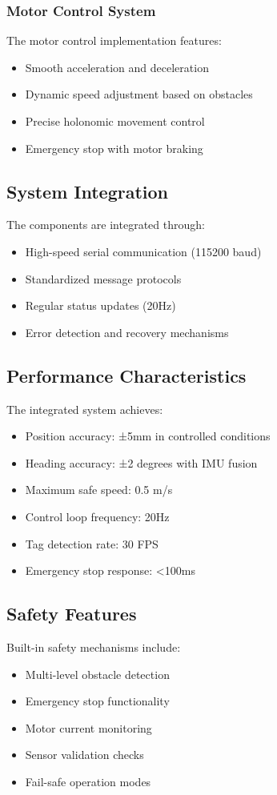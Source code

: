 \documentclass{article}
\begin{document}
\subsubsection{Motor Control System}
The motor control implementation features:
\begin{itemize}
    \item Smooth acceleration and deceleration
    \item Dynamic speed adjustment based on obstacles
    \item Precise holonomic movement control
    \item Emergency stop with motor braking
\end{itemize}

\subsection{System Integration}
The components are integrated through:
\begin{itemize}
    \item High-speed serial communication (115200 baud)
    \item Standardized message protocols
    \item Regular status updates (20Hz)
    \item Error detection and recovery mechanisms
\end{itemize}

\subsection{Performance Characteristics}
The integrated system achieves:
\begin{itemize}
    \item Position accuracy: ±5mm in controlled conditions
    \item Heading accuracy: ±2 degrees with IMU fusion
    \item Maximum safe speed: 0.5 m/s
    \item Control loop frequency: 20Hz
    \item Tag detection rate: 30 FPS
    \item Emergency stop response: <100ms
\end{itemize}

\subsection{Safety Features}
Built-in safety mechanisms include:
\begin{itemize}
    \item Multi-level obstacle detection
    \item Emergency stop functionality
    \item Motor current monitoring
    \item Sensor validation checks
    \item Fail-safe operation modes
\end{itemize}
\end{document}

